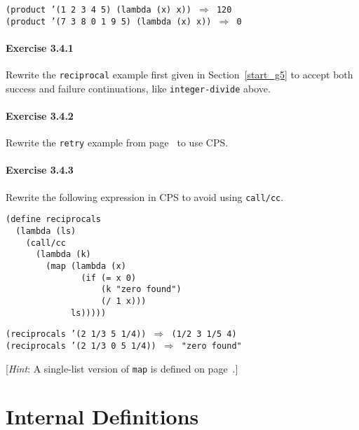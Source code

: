 \begin{alltt}
(product '(1 2 3 4 5) (lambda (x) x)) \(\Rightarrow\) 120
(product '(7 3 8 0 1 9 5) (lambda (x) x)) \(\Rightarrow\) 0
\end{alltt}

\paragraph{Exercise \label{further_g76}3.4.1}


\label{further_s75}Rewrite the \label{further_s76}\texttt{reciprocal} example first given in
Section \ref{start_g5} to accept both success and failure
continuations, like \texttt{integer-divide} above.




\paragraph{Exercise \label{further_g77}3.4.2}


\label{further_s77}Rewrite the \label{further_s78}\texttt{retry} example from page \pageref{further_retry} to use CPS.




\paragraph{Exercise \label{further_g78}3.4.3}


\label{further_s79}Rewrite the following expression in CPS to avoid using \texttt{call/cc}.


\begin{alltt}
(define reciprocals
  (lambda (ls)
    (call/cc
      (lambda (k)
        (map (lambda (x)
               (if (= x 0)
                   (k "zero found")
                   (/ 1 x)))
             ls)))))
\end{alltt}


\begin{alltt}
(reciprocals '(2 1/3 5 1/4)) \(\Rightarrow\) (1/2 3 1/5 4)
(reciprocals '(2 1/3 0 5 1/4)) \(\Rightarrow\) "zero found"
\end{alltt}


[\textit{Hint}: A single-list version of \texttt{map} is
defined on page \pageref{start_defn_map1}.]




\section{\label{further_g79}\label{further_h5}Internal Definitions\label{further_SECTGFINTERNAL}}



